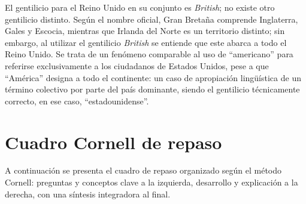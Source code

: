 \documentclass[12pt,oneside]{book}
\begin{document}
\begin{note}
El gentilicio para el Reino Unido en su conjunto es \emph{British}; no existe otro gentilicio distinto. Según el nombre oficial, Gran Bretaña comprende Inglaterra, Gales y Escocia, mientras que Irlanda del Norte es un territorio distinto; sin embargo, al utilizar el gentilicio \emph{British} se entiende que este abarca a todo el Reino Unido. Se trata de un fenómeno comparable al uso de ``americano'' para referirse exclusivamente a los ciudadanos de Estados Unidos, pese a que ``América'' designa a todo el continente: un caso de apropiación lingüística de un término colectivo por parte del país dominante, siendo el gentilicio técnicamente correcto, en ese caso, ``estadounidense''.
\end{note}

\chapter{Cuadro Cornell de repaso}

A continuación se presenta el cuadro de repaso organizado según el método Cornell: preguntas y conceptos clave a la izquierda, desarrollo y explicación a la derecha, con una síntesis integradora al final.
\end{document}
